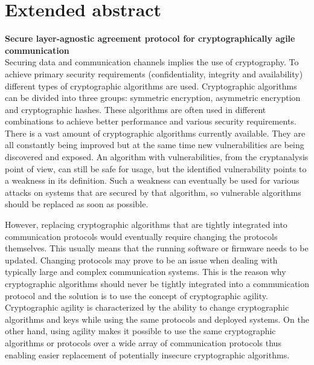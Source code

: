 \thispagestyle{empty}
\section*{Extended abstract}

{\Large{\textbf{Secure layer-agnostic agreement protocol for cryptographically
agile communication}}} \\

Securing data and communication channels implies the use of cryptography. To
achieve primary security requirements (confidentiality, integrity and
availability) different types of cryptographic algorithms are used.
Cryptographic algorithms can be divided into three groups: symmetric encryption,
asymmetric encryption and cryptographic hashes. These algorithms are often used
in different combinations to achieve better performance and various security
requirements.
There is a vast amount of cryptographic algorithms currently available. They are
all constantly being improved but at the same time new vulnerabilities are being
discovered and exposed. An algorithm with vulnerabilities, from the
cryptanalysis point of view, can still be safe for usage, but the identified
vulnerability points to a weakness in its definition. Such a
weakness can eventually be used for various attacks on systems that are secured
by that algorithm, so vulnerable algorithms should be replaced as soon as
possible.

However, replacing cryptographic algorithms that are tightly integrated into
communication protocols would eventually require changing the protocols
themselves. This usually means that the running software or firmware needs to be
updated. Changing protocols may prove to be an issue when
dealing with typically large and complex communication systems. This is the
reason why cryptographic algorithms should never be tightly integrated into a
communication protocol and the solution is to use the concept of cryptographic
agility. Cryptographic agility is characterized by the ability to change
cryptographic algorithms and keys while using the same protocols and deployed
systems. On the other hand, using agility makes it possible to use the same
cryptographic algorithms or protocols over a wide array of communication
protocols thus enabling easier replacement of potentially insecure cryptographic
algorithms.

